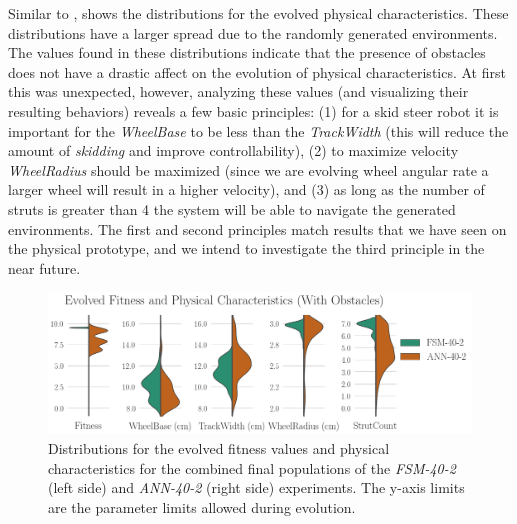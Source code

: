 Similar to ,  shows the distributions for the evolved physical characteristics.
%
These distributions have a larger spread due to the randomly generated environments.
%
The values found in these distributions indicate that the presence of obstacles does not have a drastic affect on the evolution of physical characteristics.
%
At first this was unexpected, however, analyzing these values (and visualizing their resulting behaviors) reveals a few basic principles:
(1) for a skid steer robot it is important for the \emph{WheelBase} to be less than the \emph{TrackWidth} (this will reduce the amount of \emph{skidding} and improve controllability),
(2) to maximize velocity \emph{WheelRadius} should be maximized (since we are evolving wheel angular rate a larger wheel will result in a higher velocity), and
(3) as long as the number of struts is greater than 4 the system will be able to navigate the generated environments.
%
The first and second principles match results that we have seen on the physical prototype, and we intend to investigate the third principle in the near future.
%


\begin{figure}[!ht]
    \centering

    \includegraphics[width=\columnwidth]{figures/4-results/40-2-best_params.png}


    \caption{Distributions for the evolved fitness values and physical characteristics for the combined final populations of the \emph{FSM-40-2} (left side) and \emph{ANN-40-2} (right side) experiments. The y-axis limits are the parameter limits allowed during evolution.}
    \label{fig:40-2-best-params}


\end{figure}



